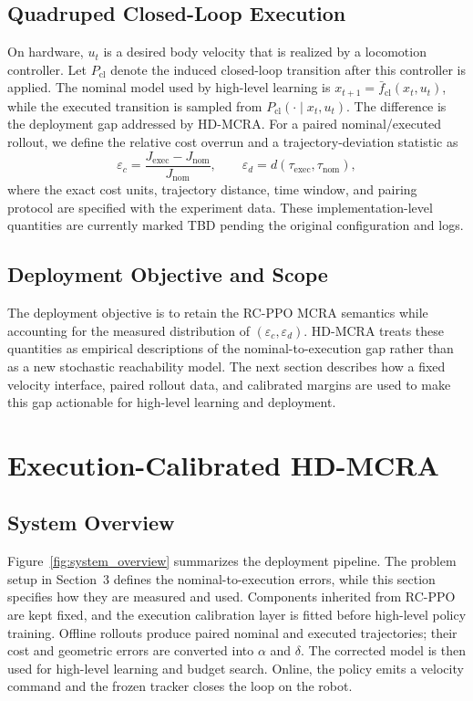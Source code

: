 \documentclass{article}
\begin{document}
\subsection{Quadruped Closed-Loop Execution}
On hardware, $u_t$ is a desired body velocity that is realized by a locomotion
controller. Let $P_{\mathrm{cl}}$ denote the induced closed-loop transition after
this controller is applied. The nominal model used by high-level learning is
$x_{t+1}=\bar f_{\mathrm{cl}}(x_t,u_t)$, while the executed transition is sampled
from $P_{\mathrm{cl}}(\cdot\mid x_t,u_t)$. The difference is the deployment gap
addressed by HD-MCRA. For a paired nominal/executed rollout, we define the relative
cost overrun and a trajectory-deviation statistic as
\begin{equation}
\varepsilon_c=\frac{J_{\mathrm{exec}}-J_{\mathrm{nom}}}{J_{\mathrm{nom}}},
\qquad
\varepsilon_d=d(\tau_{\mathrm{exec}},\tau_{\mathrm{nom}}),
\end{equation}
where the exact cost units, trajectory distance, time window, and pairing protocol
are specified with the experiment data. These implementation-level quantities are
currently marked \textsc{TBD} pending the original configuration and logs.

\subsection{Deployment Objective and Scope}
The deployment objective is to retain the RC-PPO MCRA semantics while accounting
for the measured distribution of $(\varepsilon_c,\varepsilon_d)$. HD-MCRA treats
these quantities as empirical descriptions of the nominal-to-execution gap rather
than as a new stochastic reachability model. The next section describes how a
fixed velocity interface, paired rollout data, and calibrated margins are used to
make this gap actionable for high-level learning and deployment.

\section{Execution-Calibrated HD-MCRA}
\subsection{System Overview}
Figure~\ref{fig:system_overview} summarizes the deployment pipeline. The problem
setup in Section~3 defines the nominal-to-execution errors, while this section
specifies how they are measured and used. Components inherited from RC-PPO are
kept fixed, and the execution calibration layer is fitted before high-level policy
training. Offline rollouts produce paired nominal and executed trajectories; their
cost and geometric errors are converted into $\alpha$ and $\delta$. The corrected
model is then used for high-level learning and budget search. Online, the policy
emits a velocity command and the frozen tracker closes the loop on the robot.
\end{document}
